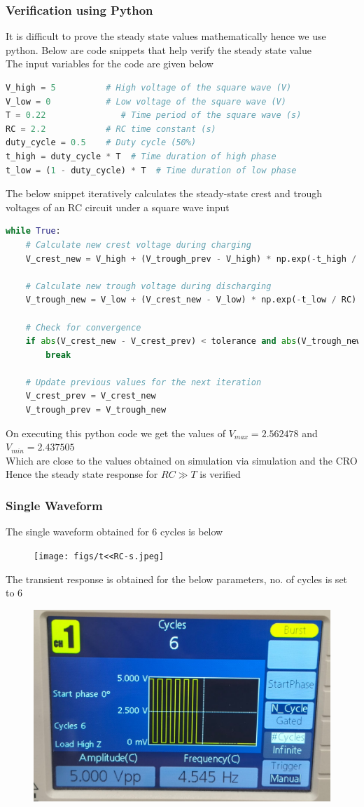 \documentclass[journal]{IEEEtran}
\begin{document}
\subsubsection{Verification using Python}
It is difficult to prove the steady state values mathematically hence we use python. Below are code snippets that help verify the steady state value \\
The input variables for the code are given below
\begin{lstlisting}[language=python]
V_high = 5          # High voltage of the square wave (V)
V_low = 0           # Low voltage of the square wave (V)
T = 0.22               # Time period of the square wave (s)
RC = 2.2            # RC time constant (s)
duty_cycle = 0.5    # Duty cycle (50%)
t_high = duty_cycle * T  # Time duration of high phase
t_low = (1 - duty_cycle) * T  # Time duration of low phase
\end{lstlisting}
The below snippet iteratively calculates the steady-state crest and trough voltages of an RC circuit under a square wave input
\begin{lstlisting}[language=python]
while True:
    # Calculate new crest voltage during charging
    V_crest_new = V_high + (V_trough_prev - V_high) * np.exp(-t_high / RC)
    
    # Calculate new trough voltage during discharging
    V_trough_new = V_low + (V_crest_new - V_low) * np.exp(-t_low / RC)
    
    # Check for convergence
    if abs(V_crest_new - V_crest_prev) < tolerance and abs(V_trough_new - V_trough_prev) < tolerance:
        break
    
    # Update previous values for the next iteration
    V_crest_prev = V_crest_new
    V_trough_prev = V_trough_new
\end{lstlisting}
On executing this python code we get the values of $V_{max} = 2.562478$ and $V_{min} = 2.437505$ \\
Which are close to the values obtained on simulation via simulation and the CRO \\
Hence the steady state response for $RC \gg T$ is verified 

\subsubsection{Single Waveform}
The single waveform obtained for 6 cycles is below 
\begin{figure}[H]
    \centering
    \texttt{[image: figs/t<<RC-s.jpeg]}
\end{figure}
The transient response is obtained for the below parameters, no. of cycles is set to 6
\begin{figure}[H]
    \centering
    \includegraphics[width=0.5\linewidth]{figs/3-cycles.jpeg}
\end{figure}
\end{document}
